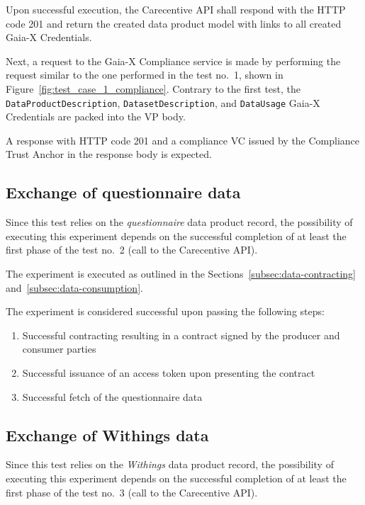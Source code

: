 Upon successful execution, the Carecentive API shall respond with the HTTP code 201 and return the created data product model with links to all created Gaia-X Credentials.

Next, a request to the Gaia-X Compliance service is made by performing the request similar to the one performed in the test no.~1, shown in Figure~\ref{fig:test_case_1_compliance}.
Contrary to the first test, the \texttt{DataProductDescription}, \texttt{DatasetDescription}, and \texttt{DataUsage} Gaia-X Credentials are packed into the VP body.

A response with HTTP code 201 and a compliance VC issued by the Compliance Trust Anchor in the response body is expected.

\subsection{Exchange of questionnaire data}\label{subsec:exchange-of-questionnaire-data}

Since this test relies on the \textit{questionnaire} data product record, the possibility of executing this experiment depends on the successful completion of at least the first phase of the test no.~2 (call to the Carecentive API).

The experiment is executed as outlined in the Sections~\ref{subsec:data-contracting} and~\ref{subsec:data-consumption}.

The experiment is considered successful upon passing the following steps:
\begin{enumerate}
    \item Successful contracting resulting in a contract signed by the producer and consumer parties
    \item Successful issuance of an access token upon presenting the contract
    \item Successful fetch of the questionnaire data
\end{enumerate}

\subsection{Exchange of Withings data}\label{subsec:exchange-of-withings-data}

Since this test relies on the \textit{Withings} data product record, the possibility of executing this experiment depends on the successful completion of at least the first phase of the test no.~3 (call to the Carecentive API).

